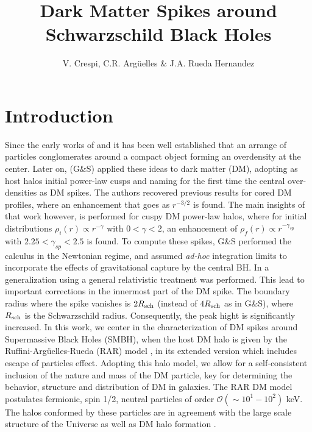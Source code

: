 \documentclass[baaa]{baaa}
\title{Dark Matter Spikes around Schwarzschild Black Holes}
\author{
V. Crespi\inst{1,2},
C.R. Argüelles\inst{1,2,3}
\&
J.A. Rueda Hernandez\inst{3,4}
}
\institute{
Facultad de Ciencias Astron\'omicas y Geof{\'\i}sicas, UNLP, Argentina\and   
Instituto de Astrofísica de La Plata, CONICET--UNLP, Argentina \and
ICRANet, Piazza della Repubblica 10, I-65122 Pescara, Italia \and
Dipartimento di Fisica e Scienze della Terra, Universita degli studi di Ferrara, Italia
}
\begin{document}
\maketitle

\section{Introduction}\label{sec:intro}

Since the early works of \cite{1972ApJ...178..371P} and \cite{young1980numerical} it has been well established that an arrange of particles conglomerates around a compact object forming an overdensity at the center. 
Later on, \cite{gondolo1999dark} (G\&S) applied these ideas to dark matter (DM), adopting as host halos initial power-law cusps and naming for the first time the central over-densities as DM spikes. 
The authors recovered previous results for cored DM profiles, where an enhancement that goes as $r^{-3/2}$ is found. The main insights of that work however, is performed for cuspy DM power-law halos, where for initial distributions $\rho_i(r)\propto r^{-\gamma}$ with $0<\gamma<2$, an enhancement of $\rho_f(r)\propto r^{-\gamma_{sp}}$ with $2.25<\gamma_{sp}<2.5$ is found. 
To compute these spikes, G\&S performed the calculus in the Newtonian regime, and assumed \textit{ad-hoc} integration limits to incorporate the effects of gravitational capture by the central BH.
In \citet{sadeghian2013dark} a generalization using a general relativistic treatment was performed. This lead to important corrections in the innermost part of the DM spike.
The boundary radius where the spike vanishes is $2R_{\rm sch}$ (instead of $4R_{\rm sch}$ as in G\&S), where $R_{\rm sch}$ is the Schwarzschild radius. Consequently, the peak hight is significantly increased.
In this work, we center in the characterization of DM spikes around Supermassive Black Holes (SMBH), when the host DM halo is given by the Ruffini-Argüelles-Rueda (RAR) model \citep{2015MNRAS.451..622R}, in its extended version \citep{2018PDU....21...82A} which includes escape of particles effect. Adopting this halo model, we allow for a self-consistent inclusion of the nature and mass of the DM particle, key for determining the behavior, structure and distribution of DM in galaxies. 
The RAR DM model postulates fermionic, spin 1/2, neutral particles of order $\mathcal{O}(\sim 10^1-10^2)$ keV. The halos conformed by these particles are in agreement with the large scale structure of the Universe as well as DM halo formation \citep{2021MNRAS.502.4227A,Arguelles:2023nlh}. 
\end{document}
